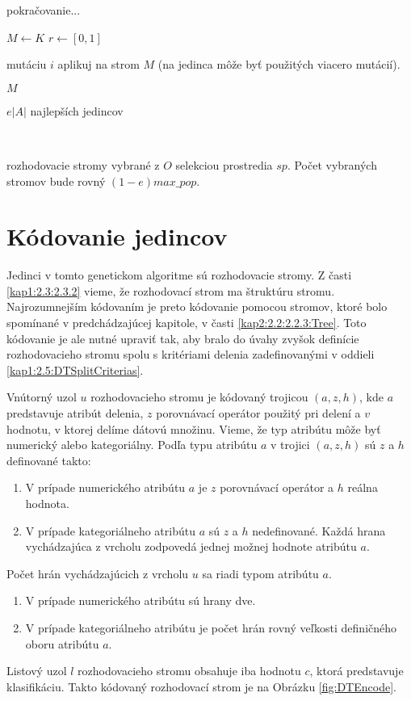 \begin{algorithm}
\ContinuedFloat
\caption{pokračovanie...}
\begin{algorithmic}[1]
\State $M \gets K$
\State $r \gets [0,1]$
	\State \parbox[t]{300pt}{mutáciu $i$ aplikuj na strom $M$ (na jedinca môže byť použitých viacero mutácií).}
\EndIf
\EndFor 
\State \Return $M$
\EndFunction
\\
\State \Return \parbox[t]{300pt}{$e |A|$ najlepších jedincov}
\EndFunction
\\
\State \Return \parbox[t]{300pt}{rozhodovacie stromy vybrané z $O$ selekciou prostredia $sp$. Počet vybraných stromov bude rovný $(1-e)max\_pop$.}
\EndFunction
\end{algorithmic}
\end{algorithm}

\section{Kódovanie jedincov}\label{kap3:3.2:Encoding}
Jedinci v tomto genetickom algoritme sú rozhodovacie stromy. Z časti \ref{kap1:2.3:2.3.2} vieme, že rozhodovací strom ma štruktúru stromu. Najrozumnejším kódovaním je preto kódovanie pomocou stromov, ktoré bolo spomínané v predchádzajúcej kapitole, v časti \ref{kap2:2.2:2.2.3:Tree}. Toto kódovanie je ale nutné upraviť tak, aby bralo do úvahy zvyšok definície rozhodovacieho stromu spolu s kritériami delenia zadefinovanými v oddieli \ref{kap1:2.5:DTSplitCriterias}.

Vnútorný uzol $u$ rozhodovacieho stromu je kódovaný trojicou $(a,z,h)$, kde $a$ predstavuje atribút delenia, $z$ porovnávací operátor použitý pri delení a $v$ hodnotu, v ktorej delíme dátovú množinu. Vieme, že typ atribútu môže byť numerický alebo kategoriálny. Podľa typu atribútu $a$ v trojici $(a,z,h)$ sú $z$ a $h$ definované takto:
\begin{enumerate}
\item V prípade numerického atribútu $a$ je $z$ porovnávací operátor a $h$ reálna hodnota.
\item V prípade kategoriálneho atribútu $a$ sú $z$ a $h$ nedefinované. Každá hrana vychádzajúca z vrcholu zodpovedá jednej možnej hodnote atribútu $a$.
\end{enumerate}
Počet hrán vychádzajúcich z vrcholu $u$ sa riadi typom atribútu $a$.
\begin{enumerate}
\item V prípade numerického atribútu sú hrany dve.
\item V prípade kategoriálneho atribútu je počet hrán rovný veľkosti definičného oboru atribútu $a$.
\end{enumerate}
Listový uzol $l$ rozhodovacieho stromu obsahuje iba hodnotu $c$, ktorá predstavuje klasifikáciu.
Takto kódovaný rozhodovací strom je na Obrázku \ref{fig:DTEncode}.

